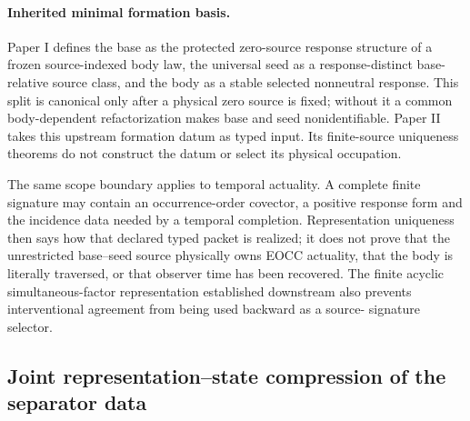 \documentclass[11pt]{article}
\begin{document}
\paragraph{Inherited minimal formation basis.}
Paper I defines the base as the protected zero-source response structure of a
frozen source-indexed body law, the universal seed as a response-distinct
base-relative source class, and the body as a stable selected nonneutral
response.  This split is canonical only after a physical zero source is fixed;
without it a common body-dependent refactorization makes base and seed
nonidentifiable.  Paper II takes this upstream formation datum as typed input.
Its finite-source uniqueness theorems do not construct the datum or select its
physical occupation.

The same scope boundary applies to temporal actuality.  A complete finite
signature may contain an occurrence-order covector, a positive response form
and the incidence data needed by a temporal completion.  Representation
uniqueness then says how that declared typed packet is realized; it does not
prove that the unrestricted base--seed source physically owns EOCC actuality,
that the body is literally traversed, or that observer time has been recovered.
The finite acyclic simultaneous-factor representation established downstream
also prevents interventional agreement from being used backward as a source-
signature selector.

\subsection{Joint representation--state compression of the separator data}
\end{document}
